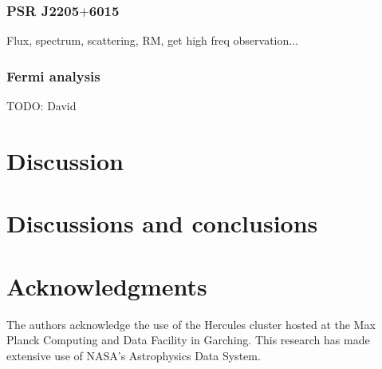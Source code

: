 \documentclass[a4paper,fleqn,usenatbib]{mnras}
\begin{document}
\subsubsection{PSR J2205$+$6015}

Flux, spectrum, scattering, RM, get high freq observation...



\subsubsection{Fermi analysis}

TODO: David


\section{Discussion}
\label{sec:discussion}


\section{Discussions and conclusions}
\label{sec:conclusion}


\section*{Acknowledgments}

The authors acknowledge the use of the Hercules cluster hosted at the
Max Planck Computing and Data Facility in Garching. This research has
made extensive use of NASA's Astrophysics Data System.







\appendix
%



\bsp	%
\label{lastpage}
\end{document}

